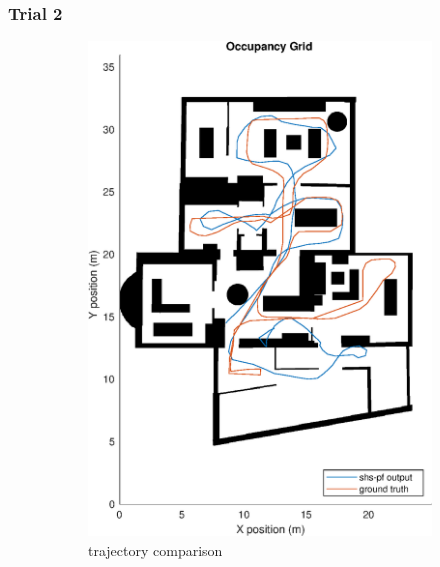 \subsubsection{Trial 2}
\begin{figure}[H]
	\centering
	\begin{subfigure}[t]{.45\textwidth}
		\centering
		\includegraphics[width=0.9\linewidth]{images/20201107_1338_trial2_Occupancy_Grid}
		\caption{trajectory comparison}
		\label{fig:shspf_trial2_on_map}
	\end{subfigure}
	\begin{subfigure}[t]{.45\textwidth}
		\centering

\end{subfigure}
\end{figure}

